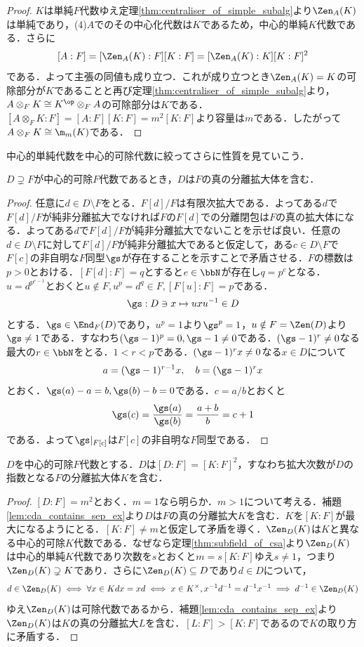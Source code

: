 \documentclass[a4paper,11pt]{jsarticle}
\begin{document}
\begin{proof}
  $K$は単純$F$代数ゆえ定理\ref{thm:centraliser_of_simple_subalg}より$\Zen_A(K)$は単純であり，(4)$A$でのその中心化代数は$K$であるため，中心的単純$K$代数である．さらに
  \[
    [A:F]=[\Zen_A(K):F][K:F]=[\Zen_A(K):K][K:F]^2
  \]
  である．よって主張の同値も成り立つ．これが成り立つとき$\Zen_A(K)=K$の可除部分が$K$であることと再び定理\ref{thm:centraliser_of_simple_subalg}より，$A\otimes_F K\cong K^{\op}\otimes_F A$の可除部分は$K$である．$[A\otimes_F K:F]=[A:F][K:F]=m^2[K:F]$より容量は$m$である．したがって$A\otimes_F K\cong\m_m(K)$である．
\end{proof}
中心的単純代数を中心的可除代数に絞ってさらに性質を見ていこう．
\begin{lem}\label{lem:cda_contains_sep_ex}
  $D\supsetneq F$が中心的可除$F$代数であるとき，$D$は$F$の真の分離拡大体を含む．
\end{lem}
\begin{proof}
  任意に$d\in D\setminus F$をとる．$F[d]/F$は有限次拡大である．よってある$d$で$F[d]/F$が純非分離拡大でなければ$F$の$F[d]$での分離閉包は$F$の真の拡大体になる．よってある$d$で$F[d]/F$が純非分離拡大でないことを示せば良い．任意の$d\in D\setminus F$に対して$F[d]/F$が純非分離拡大であると仮定して，ある$c\in D\setminus F$で$F[c]$の非自明な$F$同型$\gs$が存在することを示すことで矛盾させる．$F$の標数は$p>0$とおける．$[F[d]:F]=q$とすると$e\in\bbN$が存在し$q=p^e$となる．$u=d^{p^{e-1}}$とおくと$u\notin F, u^p=d^q\in F, [F[u]:F]=p$である．
  \[
    \gs:D\ni x\mapsto uxu^{-1}\in D
  \]
  とする．$\gs\in\End_F(D)$であり，$u^p=1$より$\gs^p=1$，$u\notin F=\Zen(D)$より$\gs\neq 1$である．すなわち$(\gs-1)^p=0,\gs-1\neq 0$である．$(\gs-1)^r\neq 0$なる最大の$r\in\bbN$をとる．$1<r<p$である．$(\gs-1)^r x\neq 0$なる$x\in D$について
  \[
    a=(\gs-1)^{r-1}x,\quad b=(\gs-1)^rx
  \]
  とおく．$\gs(a)-a=b, \gs(b)-b=0$である．$c=a/b$とおくと
  \[
    \gs(c)=\frac{\gs(a)}{\gs(b)}=\frac{a+b}{b}=c+1
  \]
  である．よって$\gs|_{F[c]}$は$F[c]$の非自明な$F$同型である．
\end{proof}
\begin{thm}[CDAは指数次分離拡大を含む]\label{thm:cda_contains_sep_ex_of_degree_index}
  $D$を中心的可除$F$代数とする．$D$は$[D:F]=[K:F]^2$，すなわち拡大次数が$D$の指数となる$F$の分離拡大体$K$を含む．
\end{thm}
\begin{proof}
  $[D:F]=m^2$とおく．$m=1$なら明らか．$m>1$について考える．補題\ref{lem:cda_contains_sep_ex}より$D$は$F$の真の分離拡大$K$を含む．$K$を$[K:F]$が最大になるようにとる．$[K:F]\neq m$と仮定して矛盾を導く．$\Zen_D(K)$は$K$と異なる中心的可除$K$代数である．なぜなら定理\ref{thm:subfield_of_csa}より$\Zen_D(K)$は中心的単純$K$代数であり次数を$s$とおくと$m=s[K:F]$ゆえ$s\neq 1$，つまり$\Zen_D(K)\supsetneq K$であり．さらに$\Zen_D(K)\subseteq D$であり$d\in D$について，
  \[
    d\in\Zen_D(K)\iff \forall  x\in K dx=xd\iff x\in K^\times, x^{-1}d^{-1}=d^{-1}x^{-1} \implies d^{-1}\in \Zen_D(K)
  \]
  ゆえ$\Zen_D(K)$は可除代数であるから．補題\ref{lem:cda_contains_sep_ex}より$\Zen_D(K)$は$K$の真の分離拡大$L$を含む．$[L:F]>[K:F]$であるので$K$の取り方に矛盾する．
\end{proof}
\end{document}
